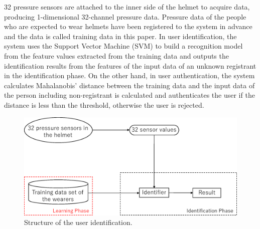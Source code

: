 \documentclass[sigchi,authordraft]{acmart}
\begin{document}
32 pressure sensors are attached to the inner side of the helmet to acquire data, producing 1-dimensional 32-channel pressure data. Pressure data of the people who are expected to wear helmets have been registered to the system in advance and the data is called training data in this paper. In user identification, the system uses the Support Vector Machine (SVM) to build a recognition model from the feature values extracted from the training data and outputs the identification results from the features of the input data of an unknown registrant in the identification phase. On the other hand, in user authentication, the system calculates Mahalanobis' distance between the training data and the input data of the person including non-registrant is calculated and authenticates the user if the distance is less than the threshold, otherwise the user is rejected.


\begin{figure}[!t]
  \centering
    \includegraphics[width=1\linewidth]{figure/system_classification.eps}
  \caption{Structure of the user identification.}
  \label{fig:system_classification}
\end{figure}
\end{document}
